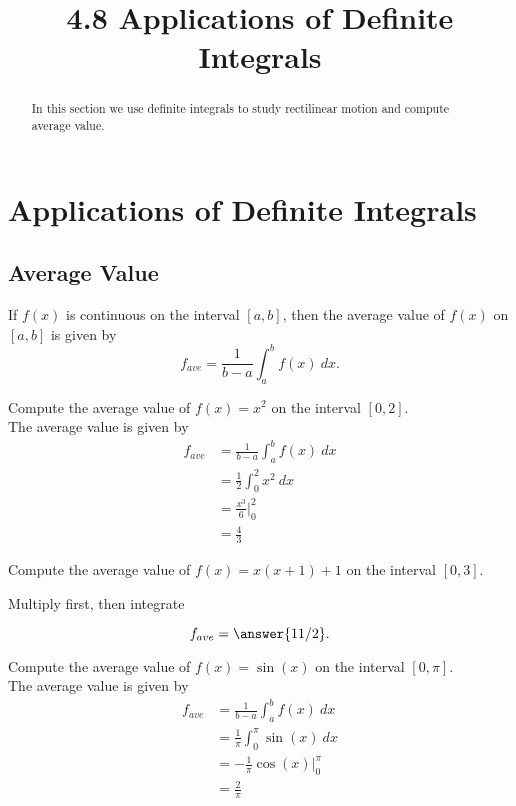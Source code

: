 \documentclass{ximera}
\title{4.8 Applications of Definite Integrals}
\begin{document}
\begin{abstract}
In this section we use definite integrals to study rectilinear motion and compute average value.
\end{abstract}

\maketitle



\section{Applications of Definite Integrals}


\subsection{Average Value}
\begin{definition}
If $f(x)$ is continuous on the interval $[a,b]$, then the average value 
of $f(x)$ on $[a,b]$ is given by
\[f_{ave} = \frac{1}{b-a}\int_a^b f(x) \ dx.\]
\end{definition}

\begin{example}
Compute the average value of $f(x) = x^2$ on the interval $[0,2]$.\\
The average value is given by 
\begin{align*}
f_{ave} &= \frac{1}{b-a}\int_a^b f(x) \ dx \\
 & = \frac12\int_0^2 x^2 \ dx \\
 & = \frac{x^3}{6} \Bigg|_0^2 \\
  & = \tfrac43
\end{align*}
\end{example}

\begin{problem}
Compute the average value of $f(x) = x(x+1) +1$ on the interval $[0,3]$.
\begin{hint}
Multiply first, then integrate
\end{hint}
\[f_{ave} = \answer{11/2}.\]
\end{problem} 

\begin{example}
Compute the average value of $f(x) = \sin(x)$ on the interval $[0,\pi]$.\\
The average value is given by 
\begin{align*}
f_{ave} &= \frac{1}{b-a}\int_a^b f(x) \ dx \\
 & = \frac{1}{\pi}\int_0^\pi \sin(x) \ dx \\
 & = -\frac{1}{\pi} \cos(x) \Bigg|_0^\pi \\
  & = \frac{2}{\pi}
\end{align*}
\end{example}
\end{document}
